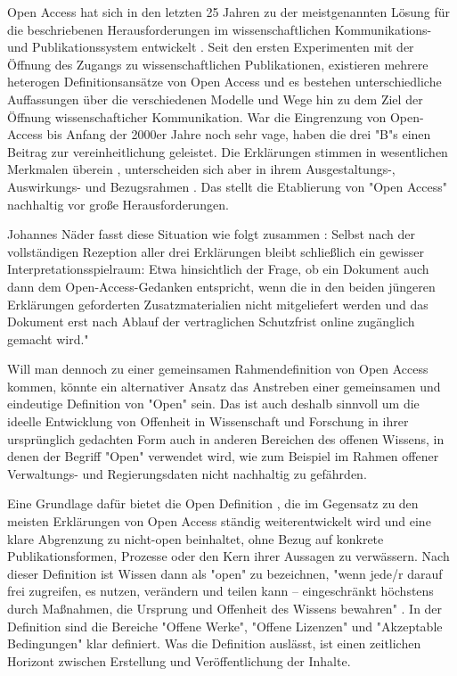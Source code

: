 Open Access hat sich in den letzten 25 Jahren zu der meistgenannten Lösung für die beschriebenen Herausforderungen im wissenschaftlichen Kommunikations- und Publikationssystem entwickelt \cite{brembs2015open}. Seit den ersten Experimenten mit der Öffnung des Zugangs zu wissenschaftlichen Publikationen, existieren mehrere heterogen Definitionsansätze von Open Access und es bestehen unterschiedliche Auffassungen über die verschiedenen Modelle und Wege hin zu dem Ziel der Öffnung wissenschafticher Kommunikation. War die Eingrenzung von Open-Access bis Anfang der 2000er Jahre noch sehr vage, haben die drei "B"s einen Beitrag zur vereinheitlichung geleistet. Die Erklärungen stimmen in wesentlichen Merkmalen überein \cite{albert_2006_open_implications}, unterscheiden sich aber in ihrem Ausgestaltungs-, Auswirkungs- und Bezugsrahmen \cite{naeder_2010_open}. Das stellt die Etablierung von "Open Access" nachhaltig vor große Herausforderungen.

Johannes Näder fasst diese Situation wie folgt zusammen \cite{naeder_2010_open}:
Selbst nach der vollständigen Rezeption aller drei Erklärungen bleibt schließlich ein gewisser Interpretationsspielraum: Etwa hinsichtlich der Frage, ob ein Dokument auch dann dem Open-Access-Gedanken entspricht, wenn die in den beiden jüngeren Erklärungen geforderten Zusatzmaterialien nicht mitgeliefert werden und das Dokument erst nach Ablauf der vertraglichen Schutzfrist online zugänglich gemacht wird."

Will man dennoch zu einer gemeinsamen Rahmendefinition von Open Access kommen, könnte ein alternativer Ansatz das Anstreben einer gemeinsamen und eindeutige Definition von "Open" sein. Das ist auch deshalb sinnvoll um die ideelle Entwicklung von Offenheit in Wissenschaft und Forschung in ihrer ursprünglich gedachten Form auch in anderen Bereichen des offenen Wissens, in denen der Begriff "Open" verwendet wird, wie zum Beispiel im Rahmen offener Verwaltungs- und Regierungsdaten nicht nachhaltig zu gefährden.

Eine Grundlage dafür bietet die Open Definition \cite{open_definition}, die im Gegensatz zu den meisten Erklärungen von Open Access ständig weiterentwickelt wird und eine klare Abgrenzung zu nicht-open beinhaltet, ohne Bezug auf konkrete Publikationsformen, Prozesse oder den Kern ihrer Aussagen zu verwässern. Nach dieser Definition ist Wissen dann als "open" zu bezeichnen, "wenn jede/r darauf frei zugreifen, es nutzen, verändern und teilen kann – eingeschränkt höchstens durch Maßnahmen, die Ursprung und Offenheit des Wissens bewahren" \cite{open_definition}. In der Definition sind die Bereiche "Offene Werke", "Offene Lizenzen" und "Akzeptable Bedingungen" klar definiert. Was die Definition auslässt, ist einen zeitlichen Horizont zwischen Erstellung und Veröffentlichung der Inhalte.

